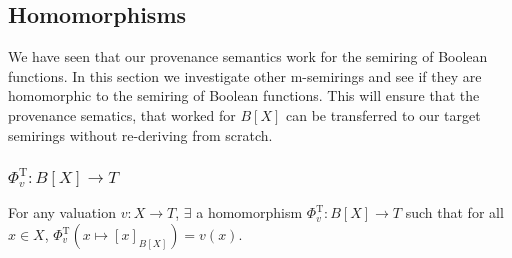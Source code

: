 \subsection{Homomorphisms}
We have seen that our provenance semantics work for 
the semiring of Boolean functions. In this section we investigate other m-semirings and see if they are homomorphic 
to the semiring of Boolean functions. This will ensure that the provenance sematics, that worked for $B[X]$ can be transferred to 
our target semirings without re-deriving from scratch.


\subsubsection{$\Phi^{\mathrm{T}}_v : B[X] \to T$}
For any valuation $v:X \to T$,  $\exists$ a homomorphism $\Phi^{\mathrm{T}}_v : B[X] \to T$ such that for all $x\in X$, 
$\Phi^{\mathrm{T}}_v(x\mapsto [x]_{B[X]})=v(x)$.

